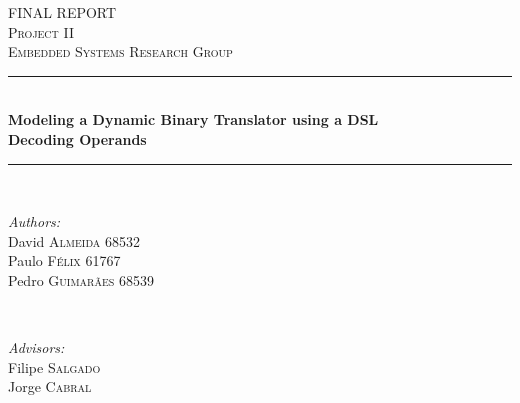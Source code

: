 \documentclass[12pt]{article}
\begin{document}
\begin{titlepage}

\newcommand{\HRule}{\rule{\linewidth}{0.5mm}} %

\center %
 

\textsc{\LARGE FINAL REPORT}\\[1.0cm] %
\textsc{\Large Project II}\\[0.5cm] %
\textsc{\large Embedded Systems Research Group}\\[0.5cm] %


\HRule \\[1.2cm]
{ \Huge \bfseries 
Modeling a Dynamic Binary Translator using a DSL}\\[1.0cm] %
{ \Large \bfseries 
Decoding Operands}\\[0.4cm]

\HRule \\[3.0cm]
 
\begin{minipage}{0.4\textwidth}
\begin{flushleft} \large
\emph{Authors:}\\
David \textsc{Almeida} 68532 \\
Paulo \textsc{Félix} 61767  \\
Pedro \textsc{Guimarães} 68539 
\end{flushleft}
\end{minipage}
~
\begin{minipage}{0.4\textwidth}
\begin{flushright} \large
 \emph{Advisors:} \\
Filipe \textsc{Salgado} \\ %
Jorge \textsc{Cabral} %
\end{flushright}
\end{minipage}\\[2cm]


\end{titlepage}
\end{document}
